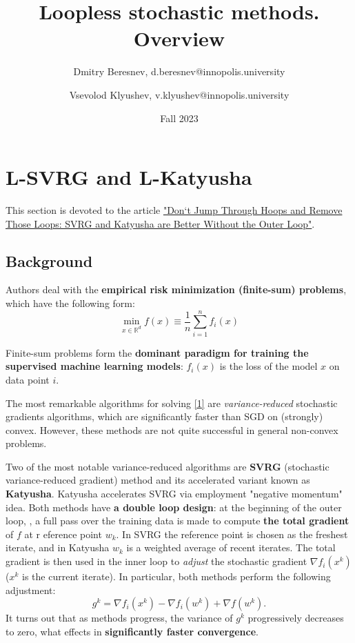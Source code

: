 \documentclass{article}
\title{Loopless stochastic methods. Overview}
\date{Fall 2023}
\author{
  Dmitry Beresnev, d.beresnev@innopolis.university
  \and
  Vsevolod Klyushev, v.klyushev@innopolis.university
}
\begin{document}
\maketitle
\section{L-SVRG and L-Katyusha}

This section is devoted to the article
\href{https://proceedings.mlr.press/v117/kovalev20a.html}
{"Don`t Jump Through Hoops and Remove Those Loops:
  SVRG and Katyusha are Better Without the Outer Loop"}.

\subsection{Background}


Authors deal with the \textbf{empirical risk minimization (finite-sum) problems},
which have the following form:
\[  \min_{x \in \mathbb{R}^d } f(x) \equiv \frac{1}{n} \sum_{i=1}^{n} f_i(x)
\tag{1}\label{1} \]

Finite-sum problems form the \textbf{dominant paradigm for training the supervised
machine learning models}: \( f_i(x) \) is the loss of the model \(x\) on data point \(i\).

The most remarkable algorithms for solving \eqref{1} are
\textit{variance-reduced} stochastic gradients algorithms, which are significantly
faster than SGD on (strongly) convex. However, these methods are not quite
successful in general non-convex problems.

Two of the most notable variance-reduced algorithms are \textbf{SVRG}
(stochastic variance-reduced gradient) method and its accelerated variant
known as \textbf{Katyusha}. Katyusha accelerates SVRG via employment
"negative momentum" idea. Both methods have \textbf{a double loop design}:
at the beginning of the outer loop, , a full pass over the training data is made
to compute \textbf{the total gradient} of \(f\) at r eference point \(w_k\).
In SVRG the reference point is chosen as the freshest iterate, and in Katyusha
\(w_k\) is a weighted average of recent iterates. The total gradient is then
used in the inner loop to \textit{adjust} the stochastic gradient
\(\nabla f_i(x^k)\) (\(x^k\) is the current iterate). In particular, both methods
perform the following adjustment:
\[g^k=\nabla f_i(x^k)-\nabla f_i(w^k)+\nabla f(w^k). \tag{2}\label{2}\]
It turns out that as methods progress, the variance of \(g^k\) progressively
decreases to zero, what effects in \textbf{significantly faster convergence}.
\end{document}
